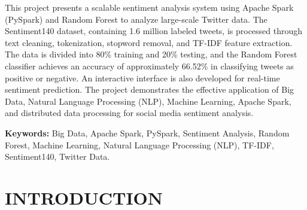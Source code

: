 \documentclass[12pt,a4paper]{article}
\begin{document}
\begin{justify}
\sloppy
{}
\setlength{\parindent}{0pt}

This project presents a scalable sentiment analysis system using Apache Spark (PySpark) and Random Forest to analyze large-scale Twitter data. The Sentiment140 dataset, containing 1.6 million labeled tweets, is processed through text cleaning, tokenization, stopword removal, and TF-IDF feature extraction. The data is divided into 80\% training and 20\% testing, and the Random Forest classifier achieves an accuracy of approximately 66.52\% in classifying tweets as positive or negative. An interactive interface is also developed for real-time sentiment prediction. The project demonstrates the effective application of Big Data, Natural Language Processing (NLP), Machine Learning, Apache Spark, and distributed data processing for social media sentiment analysis.

\textbf{Keywords:} Big Data, Apache Spark, PySpark, Sentiment Analysis, Random Forest, Machine Learning, Natural Language Processing (NLP), TF-IDF, Sentiment140, Twitter Data.
\end{justify}

\newpage


\newpage
\thispagestyle{empty}

\tableofcontents




\listoffigures



\listoftables

\newpage

\newpage
\setcounter{page}{1}

\section{INTRODUCTION}
\end{document}
